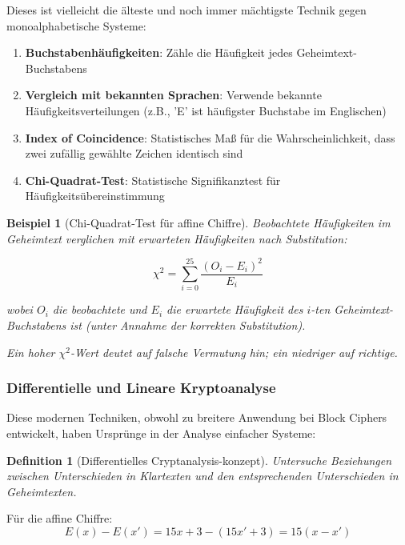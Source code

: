 ﻿\documentclass[12pt,a4paper]{article}
\newtheorem{definition}{Definition}
\newtheorem{example}{Beispiel}
\begin{document}
	Dieses ist vielleicht die älteste und noch immer mächtigste Technik gegen monoalphabetische Systeme:
	
	\begin{enumerate}
		\item \textbf{Buchstabenhäufigkeiten}: Zähle die Häufigkeit jedes Geheimtext-Buchstabens
		\item \textbf{Vergleich mit bekannten Sprachen}: Verwende bekannte Häufigkeitsverteilungen (z.B., 'E' ist häufigster Buchstabe im Englischen)
		\item \textbf{Index of Coincidence}: Statistisches Maß für die Wahrscheinlichkeit, dass zwei zufällig gewählte Zeichen identisch sind
		\item \textbf{Chi-Quadrat-Test}: Statistische Signifikanztest für Häufigkeitsübereinstimmung
	\end{enumerate}
	
	\begin{example}[Chi-Quadrat-Test für affine Chiffre]
		Beobachtete Häufigkeiten im Geheimtext verglichen mit erwarteten Häufigkeiten nach Substitution:
		
		\begin{equation}
			\chi^2 = \sum_{i=0}^{25} \frac{(O_i - E_i)^2}{E_i}
		\end{equation}
		
		wobei $O_i$ die beobachtete und $E_i$ die erwartete Häufigkeit des $i$-ten Geheimtext-Buchsta\-bens ist (unter Annahme der korrekten Substitution).
		
		Ein hoher $\chi^2$-Wert deutet auf falsche Vermutung hin; ein niedriger auf richtige.
	\end{example}
	
	\subsubsection{Differentielle und Lineare Kryptoanalyse}
	
	Diese modernen Techniken, obwohl zu breitere Anwendung bei Block Ciphers entwickelt, haben Ursprünge in der Analyse einfacher Systeme:
	
	\begin{definition}[Differentielles Cryptanalysis-konzept]
		Untersuche Beziehungen zwischen Unterschieden in Klartexten und den entsprechenden Unterschieden in Geheimtexten.
	\end{definition}
	
	Für die affine Chiffre:
	\begin{equation}
		E(x) - E(x') = 15x + 3 - (15x' + 3) = 15(x - x')
	\end{equation}
	
\end{document}
